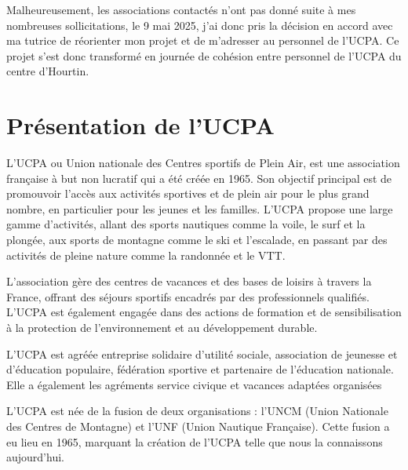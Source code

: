 \documentclass[12pt,a4paper]{report}
\begin{document}
Malheureusement, les associations contactés n'ont pas donné suite
à mes nombreuses sollicitations,
le 9 mai 2025, j'ai donc pris la décision en accord avec 
ma tutrice de réorienter mon projet et de m'adresser au personnel de 
l'UCPA. Ce projet s'est donc transformé en journée de cohésion 
entre personnel de l'UCPA du centre d'Hourtin.

\section{Présentation de l'UCPA}

L'UCPA ou Union nationale des Centres sportifs de Plein Air, est une association
française à but non lucratif qui a été créée en 1965. Son objectif principal est
de promouvoir l'accès aux activités sportives et de plein air pour le plus grand
nombre, en particulier pour les jeunes et les familles. L'UCPA propose une large
gamme d'activités, allant des sports nautiques comme la voile, le surf et la plongée,
aux sports de montagne comme le ski et l'escalade, en passant par des activités de
pleine nature comme la randonnée et le VTT.

L'association gère des centres de vacances et des bases de loisirs à travers la France,
offrant des séjours sportifs encadrés par des professionnels qualifiés. L'UCPA est
également engagée dans des actions de formation et de sensibilisation à la 
protection de l'environnement et au développement durable.

L’UCPA est agréée entreprise solidaire d’utilité sociale, association de
jeunesse et d’éducation populaire, fédération sportive et partenaire de 
l’éducation nationale. Elle a également les agréments service civique et
vacances adaptées organisées


L'UCPA est  née de la fusion de deux organisations : l'UNCM 
(Union Nationale des Centres de Montagne)
et l'UNF (Union Nautique Française). Cette fusion a eu lieu en
1965, marquant la création de l'UCPA telle que nous la connaissons aujourd'hui.
\end{document}
